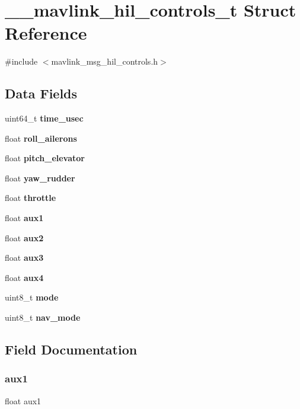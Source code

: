 \section{\+\_\+\+\_\+mavlink\+\_\+hil\+\_\+controls\+\_\+t Struct Reference}
\label{struct____mavlink__hil__controls__t}


{\ttfamily \#include $<$mavlink\+\_\+msg\+\_\+hil\+\_\+controls.\+h$>$}

\subsection*{Data Fields}
\begin{DoxyCompactItemize}
\item 
uint64\+\_\+t \textbf{ time\+\_\+usec}
\item 
float \textbf{ roll\+\_\+ailerons}
\item 
float \textbf{ pitch\+\_\+elevator}
\item 
float \textbf{ yaw\+\_\+rudder}
\item 
float \textbf{ throttle}
\item 
float \textbf{ aux1}
\item 
float \textbf{ aux2}
\item 
float \textbf{ aux3}
\item 
float \textbf{ aux4}
\item 
uint8\+\_\+t \textbf{ mode}
\item 
uint8\+\_\+t \textbf{ nav\+\_\+mode}
\end{DoxyCompactItemize}


\subsection{Field Documentation}
\mbox{\label{struct____mavlink__hil__controls__t_a236feb6a68debe6bdb5dce4165da6aa5}} 
\subsubsection{aux1}
{\footnotesize\ttfamily float aux1}

\mbox{\label{struct____mavlink__hil__controls__t_a08dcfa7a137e00a7f223d8be0c0f658d}} 
